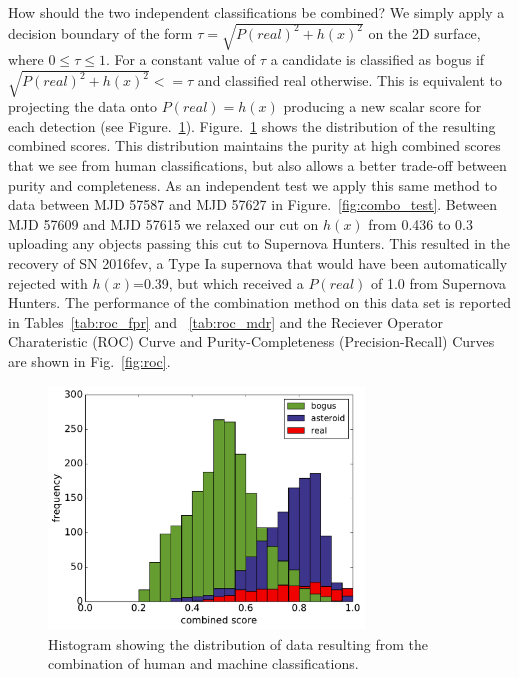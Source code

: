 \documentclass[a4paper,fleqn,usenatbib]{mnras}
\begin{document}
How should the two independent classifications be combined?  We simply apply a decision boundary of the form $\tau = \sqrt{P(real)^2 + h(x)^2}$ on the 2D surface, where $0\leq\tau\leq1$.  For a constant value of $\tau$ a candidate is classified as bogus if $\sqrt{P(real)^2 + h(x)^2} <= \tau$ and classified real otherwise.  This is equivalent to projecting the data onto $P(real)=h(x)$ producing a new scalar score for each detection (see Figure.~\ref{fig:combo_hist}).  Figure.~\ref{fig:combo_hist} shows the distribution of the resulting combined scores.  This distribution maintains the purity at high combined scores that we see from human classifications, but also allows a better trade-off between purity and completeness.  As an independent test we apply this same method to data between MJD 57587 and MJD 57627 in
Figure.~\ref{fig:combo_test}.  Between MJD 57609 and MJD 57615 we relaxed our cut on $h(x)$ from 0.436 to 0.3 uploading any objects passing this cut to Supernova Hunters.  This resulted in the recovery of SN 2016fev, a Type Ia supernova that would have been automatically rejected with $h(x)$=0.39, but which received a $P(real)$ of 1.0 from Supernova Hunters.  The performance of the combination method on this data set is reported in Tables~\ref{tab:roc_fpr} and ~\ref{tab:roc_mdr} and the Reciever Operator Charateristic (ROC) Curve and Purity-Completeness (Precision-Recall) Curves are shown in Fig.~\ref{fig:roc}.

\begin{figure}
   \includegraphics[width=84mm]{figs/combo_hist.pdf}
   \caption{Histogram showing the distribution of data resulting from the combination of human and machine classifications.}
   \label{fig:combo_hist} 
\end{figure}
\end{document}
